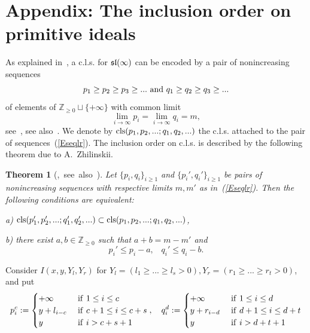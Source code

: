 \documentclass[10pt]{amsart}\oddsidemargin -1mm \evensidemargin -1mm \topmargin -15mm\headheight5mm \headsep 3.5mm \textheight 245mm\textwidth 170mm %
\newtheorem{theorem}{Theorem}[section]\newtheorem{lemma}[theorem]{Lemma}\newtheorem{claim}[theorem]{Claim}\newtheorem{remark}[theorem]{Remark}\newtheorem{proposition}[theorem]{Proposition}\newtheorem{corollary}[theorem]{Corollary}\newtheorem{definition}[theorem]{Definition}\newtheorem{Ex}[theorem]{Example}\newtheorem*{Ex0}{Examples}
\begin{document}
\section{Appendix: The inclusion order on primitive ideals}
As explained in~\cite[Subsection~7.3]{PP1}, a c.l.s. for $\frak{sl}(\infty)$ can be encoded by a pair of nonincreasing sequences
\begin{equation}\label{Eseqlr}p_1\ge p_2\ge p_3\ge...{\rm~and~}q_1\ge q_2\ge q_3\ge...\end{equation}
of elements of $\mathbb Z_{\ge0}\sqcup\{+\infty\}$ with common limit
$$\lim\limits_{i\to\infty}p_i=\lim\limits_{i\to\infty}q_i=m,$$
see~\cite{Zh1}, see also~\cite[Proposition~7.5 and Subsection~7.3]{PP1}. We denote by ${\rm cls}(p_1, p_2,... ; q_1, q_2,...)$ the c.l.s. attached to the pair of sequences~(\ref{Eseqlr}).
The inclusion order on c.l.s. is described by the following theorem due to A.~Zhilinskii.
\begin{theorem}[{\cite[Subsection 2.5]{Zh1},~see~also~\cite[Subsection~7.3]{PP1}}]\label{Tiap}Let $\{p_i, q_i\}_{i\ge 1}$ and $\{p_i', q_i'\}_{i\ge 1}$ be pairs of nonincreasing sequences with respective limits $m, m'$ as in~(\ref{Eseqlr}). Then the following conditions are equivalent:

a) ${\rm cls}(p_1', p_2',...; q_1', q_2',...)\subset{\rm cls}(p_1, p_2,...; q_1, q_2,...)$,

b) there exist $a, b\in\mathbb Z_{\ge0}$ such that $a+b=m-m'$ and
$$p_i'\le p_i-a,\hspace{10pt}q_i'\le q_i-b.$$
\end{theorem}
Consider $I(x, y,Y_l, Y_r)$ for $Y_l=( l_1\ge...\ge l_s>0), Y_r=(r_1\ge...\ge r_t>0)$, and put
\begin{equation}p^c_i:=\begin{cases}+\infty&{\rm~if~} 1\le i\le c\\y+l_{i-c}&{\rm~if~} c+1\le i\le c+s\\y&{\rm~if~} i>c+s+1\\\end{cases},\hspace{10pt}q^d_i:=\begin{cases}+\infty&{\rm~if~} 1\le i\le d\\y+r_{i-d}&{\rm~if~} d+1\le i\le d+t\\y&{\rm~if~} i>d+t+1\\\end{cases}\label{Eseqpq}\end{equation}
\end{document}
